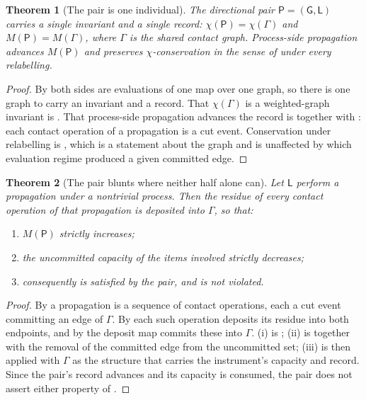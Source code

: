 \documentclass[11pt,twocolumn,a4paper]{article}
\theoremstyle{dirthm}
\newtheorem{theorem}{Theorem}[section]
\theoremstyle{definition}
\theoremstyle{remark}
\newcommand{\Gph}{\Gamma}
\newcommand{\rec}{M}
\newcommand{\Char}{\chi}
\newcommand{\Model}{\mathsf{L}}
\newcommand{\Graph}{\mathsf{G}}
\newcommand{\Pair}{\mathsf{P}}
\begin{document}
\begin{theorem}[The pair is one individual]
\label{thm:pair}
The directional pair $\Pair=(\Graph,\Model)$ carries a single invariant and a
single record: $\Char(\Pair)=\Char(\Gph)$ and $\rec(\Pair)=\rec(\Gph)$, where
$\Gph$ is the shared contact graph. Process-side propagation advances
$\rec(\Pair)$ and preserves $\Char$-conservation in the sense of
 under every relabelling.
\end{theorem}

\begin{proof}
By  both sides are evaluations of one map over one graph, so
there is one graph to carry an invariant and a record. That
$\Char(\Gph)$ is a weighted-graph invariant is . That
process-side propagation advances the record is  together
with : each contact operation of a propagation is a cut
event. Conservation under relabelling is , which is a
statement about the graph and is unaffected by which evaluation regime
produced a given committed edge.
\end{proof}

\begin{theorem}[The pair blunts where neither half alone can]
\label{thm:pair-blunts}
Let $\Model$ perform a propagation under a nontrivial process. Then the
residue of every contact operation of that propagation is deposited into
$\Gph$, so that:
\begin{enumerate}[label=\textup{(\roman*)},leftmargin=2.0em,itemsep=1pt]
\item $\rec(\Pair)$ strictly increases;
\item the uncommitted capacity of the items involved strictly decreases;
\item consequently  is satisfied by the pair, and
 is not violated.
\end{enumerate}
\end{theorem}

\begin{proof}
By  a propagation is a sequence of contact operations, each
a cut event committing an edge of $\Gph$. By  each such
operation deposits its residue into both endpoints, and by 
the deposit map commits these into $\Gph$. (i) is ; (ii)
is  together with the removal of the committed edge from
the uncommitted set; (iii) is then  applied with $\Gph$ as
the structure that carries the instrument's capacity and record. Since the
pair's record advances and its capacity is consumed, the pair does not assert
either property of .
\end{proof}
\end{document}
